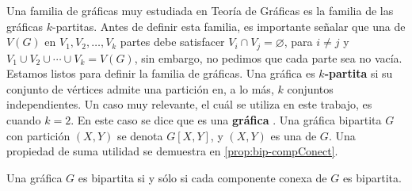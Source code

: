 Una familia de gr\'aficas muy estudiada en Teor\'ia de Gr\'aficas es la familia
de las gr\'aficas $k$-partitas. Antes de definir esta familia, es importante
se\~{n}alar que una  de
$V(G)$ en $V_1, V_2, \dots, V_k$ partes debe satisfacer $V_i \cap V_j =
\varnothing$, para $i \ne j$ y $V_1 \cup V_2 \cup \cdots \cup V_k = V(G)$, sin
embargo, no pedimos que cada parte sea no vac\'ia. Estamos listos para definir
la familia de gr\'aficas. Una gr\'afica es
$k$\textbf{-partita} si su conjunto de
v\'ertices admite una partici\'on en, a lo m\'as, $k$ conjuntos independientes.
Un caso muy relevante, el cu\'al se utiliza en este trabajo, es cuando $k=2$. En
este caso se dice que es una \textbf{gr\'afica}
. Una gr\'afica
bipartita $G$ con partici\'on $(X,Y)$ se denota $G[X,Y]$, y $(X,Y)$ es una
 de $G$. Una propiedad de suma utilidad se demuestra en
\cref{prop:bip-compConect}. 
\begin{proposicion}
\label{prop:bip-compConect}
    Una gr\'afica $G$ es bipartita si y s\'olo si cada componente conexa de $G$
    es bipartita.
\end{proposicion}

